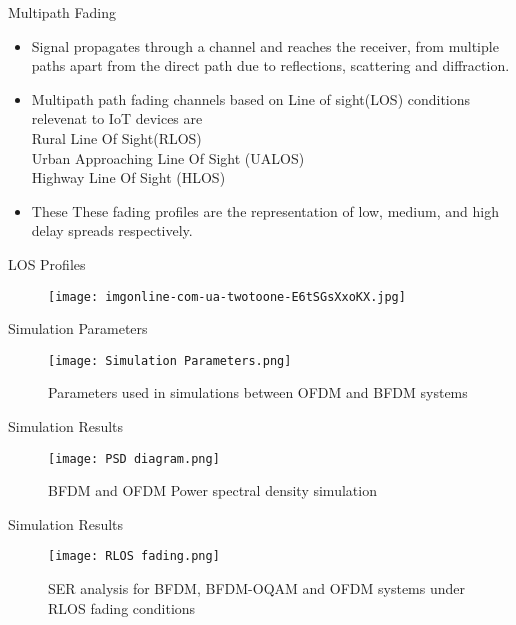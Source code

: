 \documentclass{beamer}
\begin{document}
\begin{frame}{Multipath Fading}
   \begin{itemize}
       \item  Signal propagates through a channel and reaches the receiver, from multiple paths apart from the direct path due to reflections, scattering and diffraction.
       \item Multipath path fading channels based on Line of sight(LOS) conditions relevenat to IoT devices are \\
       Rural Line Of Sight(RLOS) \\
       Urban Approaching Line Of Sight (UALOS) \\
       Highway Line Of Sight (HLOS) \\
       \item These These fading profiles are the representation of low, medium, and high delay spreads respectively.
   \end{itemize}
\end{frame}
\begin{frame}{LOS Profiles}
\begin{figure}[ht]
    \texttt{[image: imgonline-com-ua-twotoone-E6tSGsXxoKX.jpg]}
    \label{LOS Profiles}
    \end{figure}
\end{frame}
\begin{frame}{Simulation Parameters}
    \begin{figure}[ht]
    \texttt{[image: Simulation Parameters.png]}
    \label{Simulation Parameters}
    \caption{Parameters used in simulations between OFDM and BFDM systems}
    \end{figure}
\end{frame}
\begin{frame}{Simulation Results}
\begin{figure}[ht]
    \texttt{[image: PSD diagram.png]}
    \label{PSD diagram}
    \caption{BFDM and OFDM Power spectral density simulation}
    \end{figure}
\end{frame}
\begin{frame}{Simulation Results}
    \begin{figure}[ht]
    \texttt{[image: RLOS fading.png]}
    \label{RLOS fading simulation}
    \caption{ SER analysis for BFDM, BFDM-OQAM and OFDM systems under RLOS fading conditions}
    \end{figure}
\end{frame}
\end{document}
